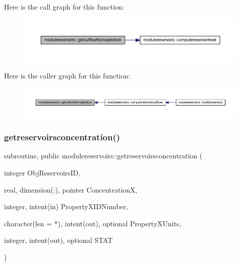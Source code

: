 Here is the call graph for this function\+:\nopagebreak
\begin{figure}[H]
\begin{center}
\leavevmode
\includegraphics[width=350pt]{namespacemodulereservoirs_ac1692cb00cb68968ee7099ff5bf14ed0_cgraph}
\end{center}
\end{figure}
Here is the caller graph for this function\+:\nopagebreak
\begin{figure}[H]
\begin{center}
\leavevmode
\includegraphics[width=350pt]{namespacemodulereservoirs_ac1692cb00cb68968ee7099ff5bf14ed0_icgraph}
\end{center}
\end{figure}
\mbox{\label{namespacemodulereservoirs_af97fb114c425ea04bf826d452e6d075f}} 
\subsubsection{\texorpdfstring{getreservoirsconcentration()}{getreservoirsconcentration()}}
{\footnotesize\ttfamily subroutine, public modulereservoirs\+::getreservoirsconcentration (\begin{DoxyParamCaption}\item[{integer}]{Obj\+Reservoirs\+ID,  }\item[{real, dimension(\+:), pointer}]{ConcentrationX,  }\item[{integer, intent(in)}]{Property\+X\+I\+D\+Number,  }\item[{character(len = $\ast$), intent(out), optional}]{Property\+X\+Units,  }\item[{integer, intent(out), optional}]{S\+T\+AT }\end{DoxyParamCaption})}

